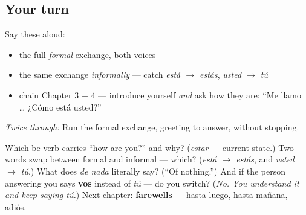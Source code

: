 \subsection*{Your turn}
Say these aloud:

\begin{itemize}
\raggedright
  \item the full \emph{formal} exchange, both voices
  \item the same exchange \emph{informally} — catch \emph{está $\to$ estás}, \emph{usted $\to$ tú}
  \item chain Chapter 3 + 4 — introduce yourself \emph{and} ask how they are: \textquotedblleft{}Me llamo … ¿Cómo está usted?\textquotedblright{}
\end{itemize}

\emph{Twice through:} Run the formal exchange, greeting to answer, without stopping.

\begin{tcolorbox}[breakable,colback=teal!4,colframe=teal!35!black,title={Before you move on}]
Which be-verb carries \textquotedblleft{}how are you?\textquotedblright{} and why? (\emph{estar} — current state.) Two words swap between formal and informal — which? (\emph{está $\to$ estás}, and \emph{usted $\to$ tú}.) What does \emph{de nada} literally say? (\textquotedblleft{}Of nothing.\textquotedblright{}) And if the person answering you says \textbf{vos} instead of \emph{tú} — do you switch? (\emph{No. You understand it and keep saying tú.}) Next chapter: \textbf{farewells} — hasta luego, hasta mañana, adiós.
\end{tcolorbox}
